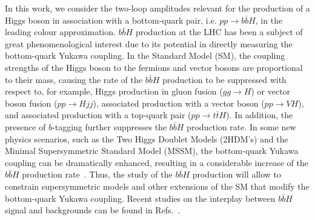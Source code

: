 \documentclass[main.tex]{subfiles}
\begin{document}
%

In this work, we consider the two-loop amplitudes relevant for the production of a Higgs boson in
association with a bottom-quark pair, i.e. $pp \to b\bar{b}H$, in the leading colour approximation.
$b\bar{b}H$ production at the LHC has been a subject of great phenomenological interest due to its
potential in directly measuring the bottom-quark Yukawa coupling. In the Standard Model (SM), the
coupling strengths of the Higgs boson to the fermions and vector bosons are proportional to their
mass, causing the rate of the $b\bar{b}H$ production to be suppressed with respect to, for example,
Higgs production in gluon fusion ($gg\to H$) or vector boson fusion ($pp\to Hjj$), associated
production with a vector boson ($pp\to VH$), and associated production with a top-quark pair ($pp\to
t\bar{t}H$). In addition, the presence of $b$-tagging further suppresses the $b\bar{b}H$ production
rate.  In some new physics scenarios, such as the Two Higgs Doublet Models (2HDM's) and the Minimal
Supersymmetric Standard Model (MSSM), the bottom-quark Yukawa coupling can be dramatically enhanced,
resulting in a considerable increase of the $b\bar{b}H$ production
rate~\cite{Balazs:1998nt,Dawson:2005vi}.  Thus, the study of the $b\bar{b}H$ production will allow
to constrain supersymmetric models and other extensions of the SM that modify the bottom-quark
Yukawa coupling. Recent studies on the interplay between $b\bar{b}H$ signal and backgrounds can be
found in Refs.~\cite{Pagani:2020rsg,Grojean:2020ech,Konar:2021nkk}.
\end{document}
